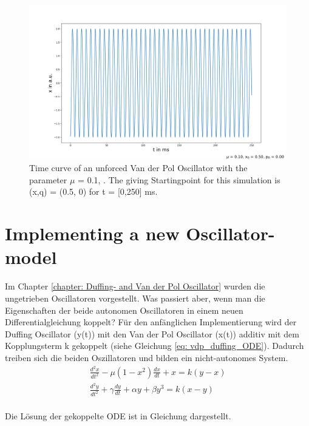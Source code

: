 \documentclass[oneside,10pt,a4paper]{report}
\begin{document}
			\begin{figure}[H]
			\centering
			\includegraphics[scale=0.4]{vdp_unforced_x.png}
			\caption{Time curve of an unforced Van der Pol Oscillator with the parameter $\mu$ = 0.1, . The giving Startingpoint for this simulation is (x,q) = (0.5, 0)\cite{Nonlinear_Dynamic_and_chaos_book} for t = [0,250] ms.}
			\label{fig: vdp_unforced_x}
		\end{figure}
		
		\chapter{Implementing a new Oscillator-model}
		Im Chapter \ref{chapter: Duffing- and Van der Pol Oscillator} wurden die ungetrieben Oscillatoren vorgestellt. Was passiert aber, wenn man die Eigenschaften der beide autonomen Oscillatoren in einem neuen Differentialgleichung koppelt?
		Für den anfänglichen Implementierung wird der Duffing Oscillator (y(t)) mit den Van der Pol Oscillator (x(t)) additiv mit dem Kopplungsterm k gekoppelt (siehe Gleichung \ref{eq: vdp_duffing_ODE}).
		Dadurch treiben sich die beiden Oszillatoren und bilden ein nicht-autonomes System.
		\begin{equation}\label{eq: vdp_duffing_ODE}
			\begin{split}
				\frac{d^2x}{dt^2} - \mu (1 - x^2) \frac{dx}{dt} + x = k ( y- x )\\
				\frac{d^2y}{dt^2} + \gamma \frac{dy}{dt} + \alpha y + \beta y^3 = k ( x-y )\\
			\end{split}
		\end{equation}
		
		Die Lösung der gekoppelte ODE ist in Gleichung  dargestellt.
\end{document}
